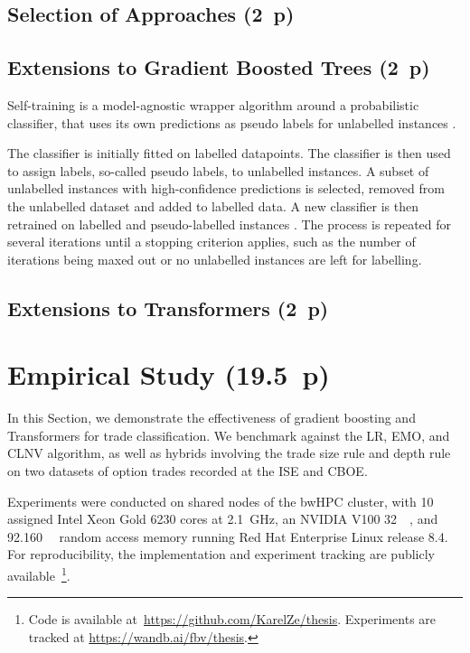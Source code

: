 \subsection{Selection of Approaches (2~p)}\label{sec:selection-of-approaches-1}

\subsection{Extensions to Gradient Boosted
    Trees (2~p)}\label{sec:extensions-to-gradient-boosted-trees}
Self-training is a model-agnostic wrapper algorithm around a probabilistic classifier, that uses its own predictions as pseudo labels for unlabelled instances \autocite[][190]{yarowskyUnsupervisedWordSense1995}.

The classifier is initially fitted on labelled datapoints. The classifier is then used to assign labels, so-called pseudo labels, to unlabelled instances. A subset of unlabelled instances with high-confidence predictions is selected, removed from the unlabelled dataset and added to labelled data. A new classifier is then retrained on labelled and pseudo-labelled instances \autocite[][190--192]{yarowskyUnsupervisedWordSense1995}. The process is repeated for several iterations until a stopping criterion applies, such as the number of iterations being maxed out or no unlabelled instances are left for labelling.
    

\subsection{Extensions to Transformers (2~p)}\label{sec:extensions-to-transformer}


\newpage
{}
\section{Empirical Study (19.5~p)}\label{sec:empirical-study}

In this Section, we demonstrate the effectiveness of gradient boosting and Transformers for trade classification. We benchmark against the \gls{LR}, \gls{EMO}, and \gls{CLNV} algorithm, as well as hybrids involving the trade size rule and depth rule on two datasets of option trades recorded at the \gls{ISE} and \gls{CBOE}.

Experiments were conducted on shared nodes of the bwHPC cluster, with 10 assigned Intel Xeon Gold 6230 cores at \SI{2.1}{\GHz}, an NVIDIA V100 \SI{32}{\giga\byte}, and \SI{92.160}{\giga\byte} random access memory running Red Hat Enterprise Linux release 8.4. For reproducibility, the implementation and experiment tracking are publicly available~\footnote{Code is available at~\url{https://github.com/KarelZe/thesis}. Experiments are tracked at \url{https://wandb.ai/fbv/thesis}.}.

